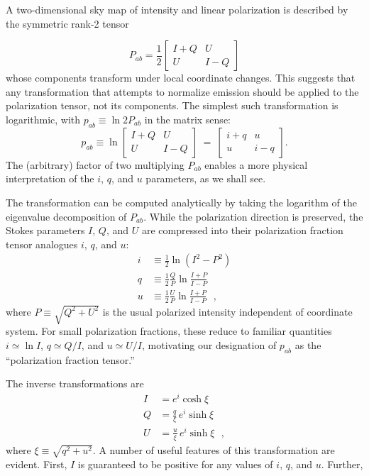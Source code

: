 \documentclass[twocolumn]{aastex631}
\begin{document}
A two-dimensional sky map of intensity and linear polarization is described by the symmetric rank-2 tensor \citep[e.g.,][]{Landau:1975}

\begin{equation}
    P_{ab} = \frac{1}{2} \left[ \begin{matrix} I+Q & U \\ U & I-Q \end{matrix} \right]
\end{equation}
whose components transform under local coordinate changes. This suggests that any transformation that attempts to normalize emission should be applied to the polarization tensor, not its components. The simplest such transformation is logarithmic, with $p_{ab} \equiv \ln 2 P_{ab}$ in the matrix sense:
\begin{equation}\label{eq:logP}
p_{ab} \equiv \ln \left[ \begin{matrix} I+Q & U \\ U & I-Q \end{matrix} \right] \ = \ 
    \left[ \begin{matrix} i+q & u \\ u & i-q \end{matrix} \right].
\end{equation}
The (arbitrary) factor of two multiplying $P_{ab}$ enables a more physical interpretation of the $i$, $q$, and $u$ parameters, as we shall see.

The transformation can be computed analytically by taking the logarithm of the eigenvalue decomposition of $P_{ab}$. While the polarization direction is preserved, the Stokes parameters $I$, $Q$, and $U$ are compressed into their polarization fraction tensor analogues $i$, $q$, and $u$:
\begin{align}\label{eq:real2pt}
    i &\equiv \frac{1}{2} \ln (I^2 - P^2)\nonumber  \\
    q &\equiv  \frac{1}{2}\frac{Q}{P} \ln \frac{I+P}{I-P} \\
    u &\equiv  \frac{1}{2}\frac{U}{P} \ln \frac{I+P}{I-P}\nonumber 
    ~~~,
\end{align}
where $P \equiv \sqrt{Q^2 + U^2}$ is the usual polarized intensity independent of coordinate system. For small polarization fractions, these reduce to familiar quantities $i\simeq\ln I$, $q\simeq Q/I$, and $u\simeq U/I$, motivating our designation of $p_{ab}$ as the ``polarization fraction tensor.''

The inverse transformations are
\begin{align}\label{eq:pt2real}
    I &= e^i \cosh \xi \nonumber \\
    Q &= \frac{q}{\xi}\,e^i\sinh \xi  \\
    U &= \frac{u}{\xi}\,e^i\sinh \xi \nonumber
    ~~~,
\end{align}
where $\xi \equiv \sqrt{q^2 + u^2}$. A number of useful features of this transformation are evident. First, $I$ is guaranteed to be positive for any values of $i$, $q$, and $u$. Further,
\end{document}
